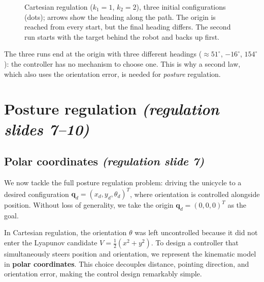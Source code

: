 \documentclass[11pt,a4paper]{article}
\theoremstyle{plain}
\theoremstyle{definition}
\theoremstyle{remark}
\begin{document}
\begin{figure}[ht]
\caption{Cartesian regulation ($k_1=1$, $k_2=2$), three initial configurations (dots); arrows show the heading along the path. The origin is reached from every start, but the final heading differs. The second run starts with the target behind the robot and backs up first.}
\label{fig:cartsim}
\end{figure}


\begin{intuition}
The three runs end at the origin with three different headings ($\approx 51^\circ$, $-16^\circ$, $154^\circ$): the controller has no mechanism to choose one. This is why a second law, which also uses the orientation error, is needed for \emph{posture} regulation.
\end{intuition}

\section{Posture regulation \emph{(regulation slides 7--10)}}

\subsection{Polar coordinates \emph{(regulation slide 7)}}

We now tackle the full posture regulation problem: driving the unicycle to a desired configuration $\bm q_d=(x_d,y_d,\theta_d)^T$, where orientation is controlled alongside position. Without loss of generality, we take the origin $\bm q_d=(0,0,0)^T$ as the goal.

In Cartesian regulation, the orientation $\theta$ was left uncontrolled because it did not enter the Lyapunov candidate $V=\frac{1}{2}(x^2+y^2)$. To design a controller that simultaneously steers position and orientation, we represent the kinematic model in \textbf{polar coordinates}. This choice decouples distance, pointing direction, and orientation error, making the control design remarkably simple.
\end{document}
